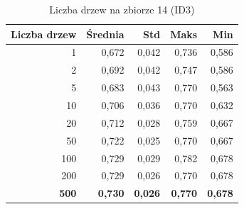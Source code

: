 \begin{table}[htbp]
\centering
\small
\setlength{\tabcolsep}{6pt}
\renewcommand{\arraystretch}{1.2}
\caption{Liczba drzew na zbiorze 14 (ID3)}
\label{tab:ID3_tree_count_14}
\begin{tabular}{r|r|r|r|r}
\toprule
Liczba drzew & Średnia & Std & Maks & Min \\
\hline
1 & 0,672 & 0,042 & 0,736 & 0,586 \\
2 & 0,692 & 0,042 & 0,747 & 0,586 \\
5 & 0,683 & 0,043 & 0,770 & 0,563 \\
10 & 0,706 & 0,036 & 0,770 & 0,632 \\
20 & 0,712 & 0,028 & 0,759 & 0,667 \\
50 & 0,722 & 0,025 & 0,770 & 0,667 \\
100 & 0,729 & 0,029 & 0,782 & 0,678 \\
200 & 0,729 & 0,026 & 0,770 & 0,678 \\
\textbf{500} & \textbf{0,730} & \textbf{0,026} & \textbf{0,770} & \textbf{0,678} \\
\bottomrule
\end{tabular}
\end{table}